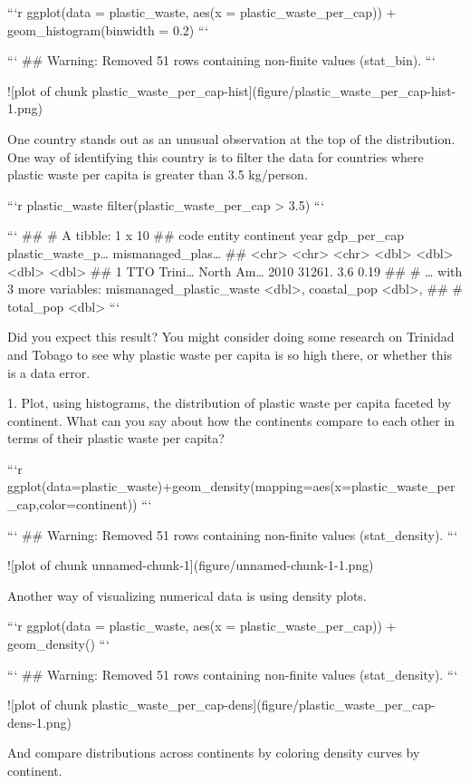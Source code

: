 ```r
ggplot(data = plastic_waste, 
       aes(x = plastic_waste_per_cap)) +
  geom_histogram(binwidth = 0.2)
```

```
## Warning: Removed 51 rows containing non-finite values (stat_bin).
```

![plot of chunk plastic_waste_per_cap-hist](figure/plastic_waste_per_cap-hist-1.png)

One country stands out as an unusual observation at the top of the distribution. One way of identifying this country is to filter the data for countries where plastic waste per capita is greater than 3.5 kg/person.


```r
plastic_waste %
  filter(plastic_waste_per_cap > 3.5)
```

```
## # A tibble: 1 x 10
##   code  entity continent  year gdp_per_cap plastic_waste_p… mismanaged_plas…
##   <chr> <chr>  <chr>     <dbl>       <dbl>            <dbl>            <dbl>
## 1 TTO   Trini… North Am…  2010      31261.              3.6             0.19
## # … with 3 more variables: mismanaged_plastic_waste <dbl>, coastal_pop <dbl>,
## #   total_pop <dbl>
```

Did you expect this result? You might consider doing some research on Trinidad and Tobago to see why plastic waste per capita is so high there, or whether this is a data error.

1. Plot, using histograms, the distribution of plastic waste per capita faceted by continent. What can you say about how the continents compare to each other in terms of their plastic waste per capita?


```r
ggplot(data=plastic_waste)+geom_density(mapping=aes(x=plastic_waste_per_cap,color=continent))
```

```
## Warning: Removed 51 rows containing non-finite values (stat_density).
```

![plot of chunk unnamed-chunk-1](figure/unnamed-chunk-1-1.png)



Another way of visualizing numerical data is using density plots.


```r
ggplot(data = plastic_waste, 
       aes(x = plastic_waste_per_cap)) +
  geom_density()
```

```
## Warning: Removed 51 rows containing non-finite values (stat_density).
```

![plot of chunk plastic_waste_per_cap-dens](figure/plastic_waste_per_cap-dens-1.png)

And compare distributions across continents by coloring density curves by continent.



